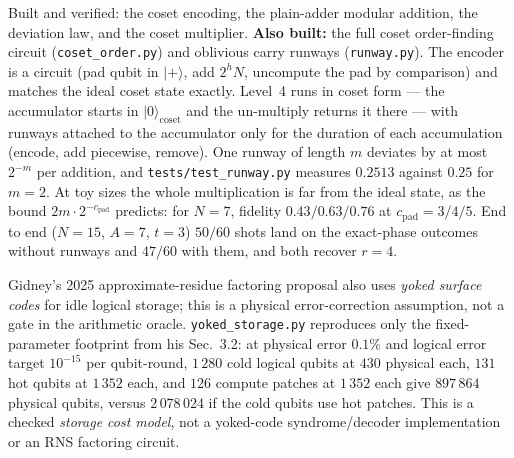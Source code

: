 \documentclass[11pt]{article}
\renewcommand{\ket}[1]{\lvert #1 \rangle}
\newcommand{\code}[1]{\texttt{#1}}
\theoremstyle{plain}
\theoremstyle{remark}
\begin{document}
\begin{warnbox}[title={What is built, and what is not}]
Built and verified: the coset encoding, the plain-adder modular addition, the deviation law, and
the coset multiplier. \textbf{Also built:} the full coset order-finding circuit (\code{coset\_order.py}) and oblivious
carry runways \cite{gidney-approx} (\code{runway.py}). The encoder is a circuit (pad qubit in $\ket+$,
add $2^hN$, uncompute the pad by comparison) and matches the ideal coset state exactly. Level~4 runs in
coset form --- the accumulator starts in $\ket0_{\mathrm{coset}}$ and the un-multiply returns it
there --- with runways attached to the accumulator only for the duration of each accumulation
(encode, add piecewise, remove). One runway of length $m$ deviates by at most $2^{-m}$ per addition, and
\code{tests/test\_runway.py} measures $0.2513$ against $0.25$ for $m=2$. At toy sizes the whole
multiplication is far from the ideal state, as the bound $2m\cdot2^{-c_{\mathrm{pad}}}$ predicts: for
$N=7$, fidelity $0.43/0.63/0.76$ at $c_{\mathrm{pad}}=3/4/5$. End to end ($N=15$, $A=7$, $t=3$)
$50/60$ shots land on the exact-phase outcomes without runways and $47/60$ with them, and both
recover $r=4$.

Gidney's 2025 approximate-residue factoring proposal also uses
\emph{yoked surface codes} for idle logical storage; this is a physical
error-correction assumption, not a gate in the arithmetic oracle.
\code{yoked\_storage.py} reproduces only the fixed-parameter footprint from
his Sec.~3.2: at physical error $0.1\%$ and logical error target $10^{-15}$
per qubit-round, $1\,280$ cold logical qubits at $430$ physical each,
$131$ hot qubits at $1\,352$ each, and $126$ compute patches at $1\,352$
each give $897\,864$ physical qubits, versus $2\,078\,024$ if the cold
qubits use hot patches. This is a checked \emph{storage cost model}, not
a yoked-code syndrome/decoder implementation or an RNS factoring circuit.


\end{warnbox}
\end{document}
